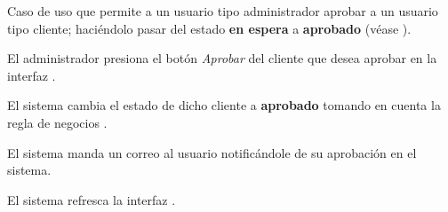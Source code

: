 %
%

{
  Caso de uso que permite a un usuario tipo administrador aprobar a un usuario
  tipo cliente; haciéndolo pasar del estado \textbf{en espera} a
  \textbf{aprobado} (véase ).

  \begin{trayectoriaPrincipal}

    \item El administrador presiona el botón \textit{Aprobar} del cliente que
      desea aprobar en la interfaz .

    \item El sistema cambia el estado de dicho cliente a \textbf{aprobado}
      tomando en cuenta la regla de negocios .

    \item El sistema manda un correo al usuario notificándole de su
      aprobación en el sistema.

    \item El sistema refresca la interfaz .

  \end{trayectoriaPrincipal}
}
